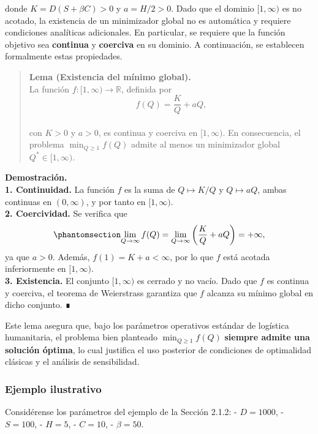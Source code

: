 \documentclass[
  spanish,
  us-letterpaper,
  DIV=11,
  numbers=noendperiod]{scrreprt}
\numberwithin{equation}{section}
\begin{document}
donde \(K = D(S + \beta C) > 0\) y \(a = H/2 > 0\). Dado que el dominio
\([1, \infty)\) es no acotado, la existencia de un minimizador global no
es automática y requiere condiciones analíticas adicionales. En
particular, se requiere que la función objetivo sea \textbf{continua} y
\textbf{coerciva} en su dominio. A continuación, se establecen
formalmente estas propiedades.

\begin{quote}
\textbf{Lema (Existencia del mínimo global).}\\
La función \(f : [1, \infty) \to \mathbb{R}\), definida por\\
\[
f(Q) = \frac{K}{Q} + a Q,
\]\\
con \(K > 0\) y \(a > 0\), es continua y coerciva en \([1, \infty)\). En
consecuencia, el problema \(\min_{Q \geq 1} f(Q)\) admite al menos un
minimizador global \(Q^* \in [1, \infty)\).
\end{quote}

\textbf{Demostración.}\\
\textbf{1. Continuidad.} La función \(f\) es la suma de
\(Q \mapsto K/Q\) y \(Q \mapsto aQ\), ambas continuas en
\((0, \infty)\), y por tanto en \([1, \infty)\).\\
\textbf{2. Coercividad.} Se verifica que
\begin{equation}\phantomsection\label{eq-lim_coercivo}{
\lim_{Q \to \infty} f(Q) = \lim_{Q \to \infty} \left( \frac{K}{Q} + a Q \right) = +\infty,
}\end{equation} ya que \(a > 0\). Además, \(f(1) = K + a < \infty\), por
lo que \(f\) está acotada inferiormente en \([1, \infty)\).\\
\textbf{3. Existencia.} El conjunto \([1, \infty)\) es cerrado y no
vacío. Dado que \(f\) es continua y coerciva, el teorema de Weierstrass
garantiza que \(f\) alcanza su mínimo global en dicho conjunto. ∎

Este lema asegura que, bajo los parámetros operativos estándar de
logística humanitaria, el problema bien planteado
\(\min_{Q \geq 1} f(Q)\) \textbf{siempre admite una solución óptima}, lo
cual justifica el uso posterior de condiciones de optimalidad clásicas y
el análisis de sensibilidad.

\subsubsection{Ejemplo ilustrativo}\label{ejemplo-ilustrativo-1}

Considérense los parámetros del ejemplo de la Sección 2.1.2: -
\(D = 1000\), - \(S = 100\), - \(H = 5\), - \(C = 10\), -
\(\beta = 50\).
\end{document}
